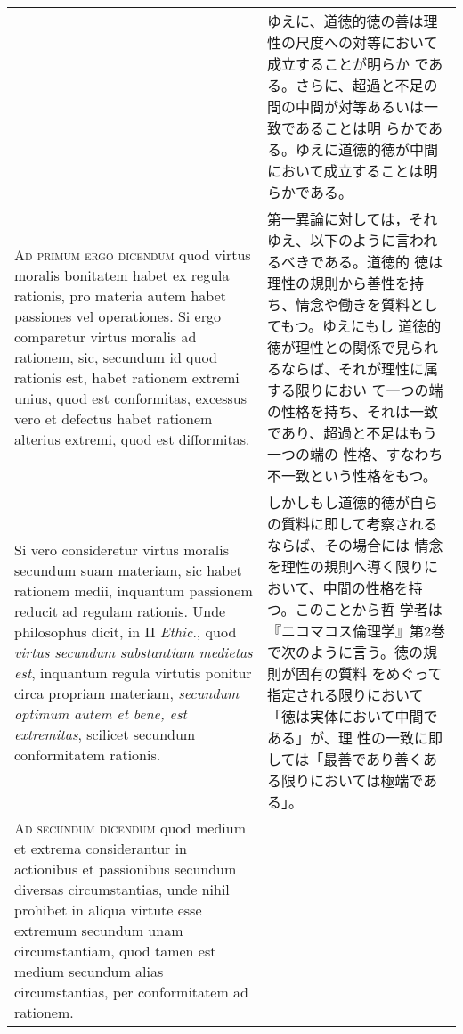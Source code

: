 \documentclass[10pt]{jsarticle}
\begin{document}
\begin{longtable}{p{21em}p{21em}}
&

 ゆえに、道徳的徳の善は理性の尺度への対等において成立することが明らか
 である。さらに、超過と不足の間の中間が対等あるいは一致であることは明
 らかである。ゆえに道徳的徳が中間において成立することは明らかである。

\\


{\scshape Ad primum ergo dicendum} quod virtus moralis bonitatem habet
ex regula rationis, pro materia autem habet passiones vel
operationes. Si ergo comparetur virtus moralis ad rationem, sic,
secundum id quod rationis est, habet rationem extremi unius, quod est
conformitas, excessus vero et defectus habet rationem alterius
extremi, quod est difformitas.

&

 第一異論に対しては，それゆえ、以下のように言われるべきである。道徳的
 徳は理性の規則から善性を持ち、情念や働きを質料としてもつ。ゆえにもし
 道徳的徳が理性との関係で見られるならば、それが理性に属する限りにおい
 て一つの端の性格を持ち、それは一致であり、超過と不足はもう一つの端の
 性格、すなわち不一致という性格をもつ。

\\



 Si vero consideretur virtus moralis secundum suam materiam, sic habet
rationem medii, inquantum passionem reducit ad regulam rationis. Unde
philosophus dicit, in II {\itshape Ethic}., quod {\itshape virtus
secundum substantiam medietas est}, inquantum regula virtutis ponitur
circa propriam materiam, {\itshape secundum optimum autem et bene, est
extremitas}, scilicet secundum conformitatem rationis.


&

 しかしもし道徳的徳が自らの質料に即して考察されるならば、その場合には
 情念を理性の規則へ導く限りにおいて、中間の性格を持つ。このことから哲
 学者は『ニコマコス倫理学』第2巻で次のように言う。徳の規則が固有の質料
 をめぐって指定される限りにおいて「徳は実体において中間である」が、理
 性の一致に即しては「最善であり善くある限りにおいては極端である」。

\\



{\scshape Ad secundum dicendum} quod medium et extrema considerantur
in actionibus et passionibus secundum diversas circumstantias, unde
nihil prohibet in aliqua virtute esse extremum secundum unam
circumstantiam, quod tamen est medium secundum alias circumstantias,
per conformitatem ad rationem.


\end{longtable}
\end{document}
